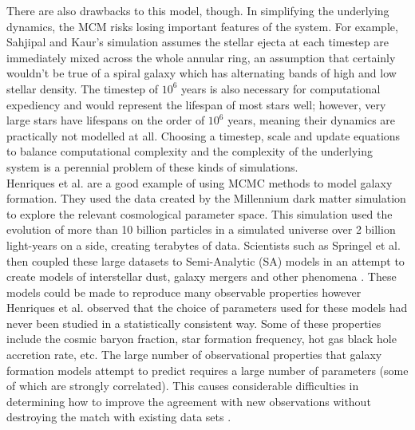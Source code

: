 \documentclass[amsmath,amssymb,reprint,
tightenlines,aps,prl,11pt]{revtex4-1}
\begin{document}
There are also drawbacks to this model, though. In simplifying the underlying dynamics, the MCM risks losing important features of the system. For example, Sahjipal and Kaur's simulation assumes the stellar ejecta at each timestep are immediately mixed across the whole annular ring, an assumption that certainly wouldn't be true of a spiral galaxy which has alternating bands of high and low stellar density. The timestep of $10^6$ years is also necessary for computational expediency and would represent the lifespan of most stars well; however, very large stars have lifespans on the order of $10^6$ years, meaning their dynamics are practically not modelled at all. Choosing a timestep, scale and update equations to balance computational complexity and the complexity of the underlying system is a perennial problem of these kinds of simulations. \\

Henriques et al. are a good example of using MCMC methods to model galaxy formation. They used the data created by the Millennium dark matter simulation to explore the relevant cosmological parameter space. This simulation used the evolution of more than 10 billion particles in a simulated universe over 2 billion light-years on a side, creating terabytes of data. Scientists such as  Springel et al. then coupled these large datasets to Semi-Analytic (SA) models in an attempt to create models of interstellar dust, galaxy mergers and other phenomena \cite{springelSimulatingJointEvolution2005}. These models could be made to reproduce many observable properties however Henriques et al. observed that the choice of parameters used for these models had never been studied in a statistically consistent way. Some of these properties include the cosmic baryon fraction, star formation frequency, hot gas black hole accretion rate, etc. The large number of observational properties that galaxy formation models attempt to predict requires a large number of parameters (some of which are strongly correlated). This causes considerable difficulties in determining how to improve the agreement with new observations without destroying the match with existing data sets \cite{henriquesMonteCarloMarkov2009}. 
\end{document}
